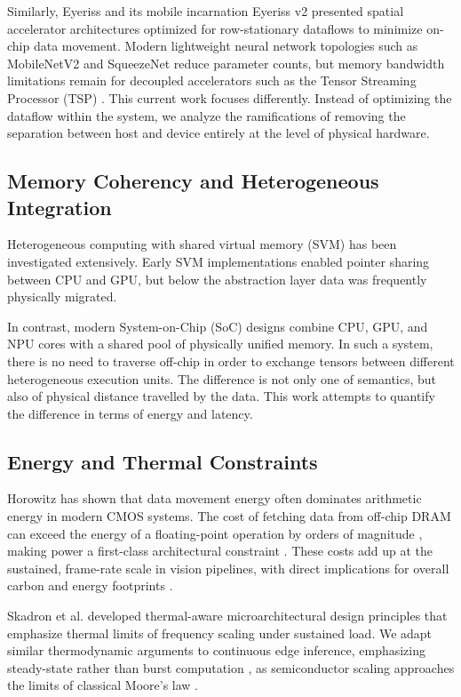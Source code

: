 \documentclass[conference]{IEEEtran}
\begin{document}
Similarly, Eyeriss \cite{b_eyeriss} and its mobile incarnation Eyeriss v2 \cite{b_eyeriss_v2} presented spatial accelerator architectures optimized for row-stationary dataflows to minimize on-chip data movement. Modern lightweight neural network topologies such as MobileNetV2 \cite{b31} and SqueezeNet \cite{b35} reduce parameter counts, but memory bandwidth limitations remain for decoupled accelerators such as the Tensor Streaming Processor (TSP) \cite{b20}. This current work focuses differently. Instead of optimizing the dataflow within the system, we analyze the ramifications of removing the separation between host and device entirely at the level of physical hardware.

\subsection{Memory Coherency and Heterogeneous Integration}
Heterogeneous computing with shared virtual memory (SVM) has been investigated extensively. Early SVM implementations enabled pointer sharing between CPU and GPU, but below the abstraction layer data was frequently physically migrated.

In contrast, modern System-on-Chip (SoC) designs combine CPU, GPU, and NPU cores with a shared pool of physically unified memory. In such a system, there is no need to traverse off-chip in order to exchange tensors between different heterogeneous execution units. The difference is not only one of semantics, but also of physical distance travelled by the data. This work attempts to quantify the difference in terms of energy and latency.

\subsection{Energy and Thermal Constraints}
Horowitz \cite{b8} has shown that data movement energy often dominates arithmetic energy in modern CMOS systems. The cost of fetching data from off-chip DRAM can exceed the energy of a floating-point operation by orders of magnitude \cite{b8, b2}, making power a first-class architectural constraint \cite{b15}. These costs add up at the sustained, frame-rate scale in vision pipelines, with direct implications for overall carbon and energy footprints \cite{b12, b_energy_dl}.

Skadron et al. \cite{b_thermal} developed thermal-aware microarchitectural design principles that emphasize thermal limits of frequency scaling under sustained load. We adapt similar thermodynamic arguments to continuous edge inference, emphasizing steady-state rather than burst computation \cite{b_thermal, b5}, as semiconductor scaling approaches the limits of classical Moore's law \cite{b18}.
\end{document}
